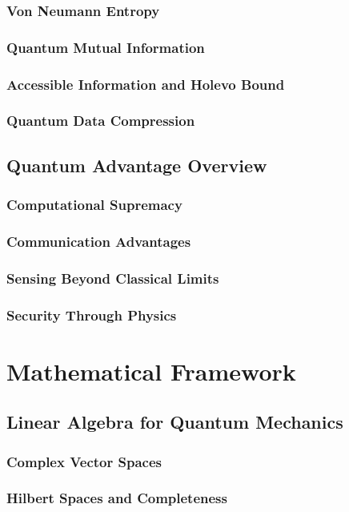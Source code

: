 \documentclass[12pt,a4paper]{book}
\begin{document}
\subsection{Von Neumann Entropy}
\subsection{Quantum Mutual Information}
\subsection{Accessible Information and Holevo Bound}
\subsection{Quantum Data Compression}

\section{Quantum Advantage Overview}
\subsection{Computational Supremacy}
\subsection{Communication Advantages}
\subsection{Sensing Beyond Classical Limits}
\subsection{Security Through Physics}

\chapter{Mathematical Framework}

\section{Linear Algebra for Quantum Mechanics}
\subsection{Complex Vector Spaces}
\subsection{Hilbert Spaces and Completeness}
\end{document}
